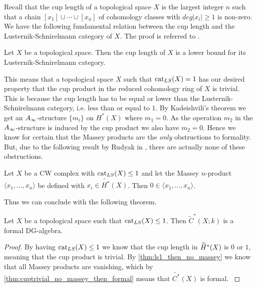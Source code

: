 Recall that the cup length of a topological space $X$ is the largest integer $n$ such that a chain $[x_1]\cup \cdots \cup [x_n]$ of cohomology classes with $deg|x_i|\geq 1$ is non-zero. We have the following fundamental relation between the cup length and the Lusternik-Schnirelmann category of $X$. The proof is referred to \cite{lscategorybook}.

\begin{lemma}
Let $X$ be a topological space. Then the cup length of $X$ is a lower bound for its Lusternik-Schnirelmann category. 
\end{lemma}



This means that a topological space $X$ such that $\text{cat}_{LS}(X)=1$ has our desired property that the cup product in the reduced cohomology ring of $X$ is trivial. This is because the cup length has to be equal or lower than the Lusternik-Schnirelmann category, i.e. less than or equal to $1$. By Kadeishvili's theorem we get an $A_{\infty}$-structure $\{m_i\}$ on $H^*(X)$ where $m_1 =0$. As the operation $m_2$ in the $A_{\infty}$-structure is induced by the cup product we also have $m_2=0$. Hence we know for certain that the Massey products are the \emph{only} obstructions to formality. But, due to the following result by Rudyak in \cite[Lemma 4.6]{Rudyak}, there are actually none of these obstructions. 

\begin{theorem}
Let $X$ be a CW complex with $\text{cat}_{LS}(X)\leq 1$ and let the Massey $n$-product $\langle x_1, \ldots, x_n\rangle$ be defined with $x_i \in \widetilde{H^*}(X)$. Then $0\in \langle x_1, \ldots, x_n\rangle $.
\label{thm:ls1_then_no_massey}
\end{theorem}

Thus we can conclude with the following theorem. 

\begin{theorem}
Let $X$ be a topological space such that $\text{cat}_{LS}(X)\leq 1$. Then $\widetilde{C}^*(X;k)$ is a formal DG-algebra.
\end{theorem}
\begin{proof}
By having $\text{cat}_{LS}(X)\leq 1$ we know that the cup length in $\widetilde{H}^*(X)$ is $0$ or $1$, meaning that the cup product is trivial. By \cref{thm:ls1_then_no_massey} we know that all Massey products are vanishing, which by  \cref{thm:cuptrivial_no_massey_then_formal} means that $\widetilde{C^*}(X)$ is formal.
\label{thm:ls1_then_reduced_formal}
\end{proof}


